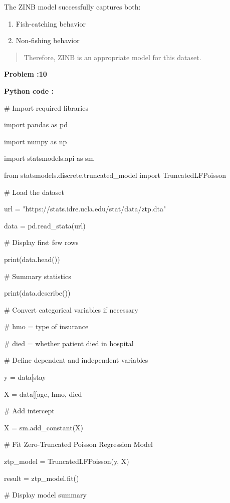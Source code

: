\documentclass[
]{article}
\begin{document}
The ZINB model successfully captures both:

\begin{enumerate}
\def\labelenumi{\arabic{enumi}.}
\item
  Fish-catching behavior
\item
  Non-fishing behavior
\end{enumerate}

\begin{quote}
Therefore, ZINB is an appropriate model for this dataset.
\end{quote}

\textbf{Problem :10}

\textbf{Python code :}

\# Import required libraries

import pandas as pd

import numpy as np

import statsmodels.api as sm

from statsmodels.discrete.truncated\_model import TruncatedLFPoisson

\# Load the dataset

url = "https://stats.idre.ucla.edu/stat/data/ztp.dta"

data = pd.read\_stata(url)

\# Display first few rows

print(data.head())

\# Summary statistics

print(data.describe())

\# Convert categorical variables if necessary

\# hmo = type of insurance

\# died = whether patient died in hospital

\# Define dependent and independent variables

y = data{[}\textquotesingle stay\textquotesingle{]}

X = data{[}{[}\textquotesingle age\textquotesingle,
\textquotesingle hmo\textquotesingle,
\textquotesingle died\textquotesingle{]}{]}

\# Add intercept

X = sm.add\_constant(X)

\# Fit Zero-Truncated Poisson Regression Model

ztp\_model = TruncatedLFPoisson(y, X)

result = ztp\_model.fit()

\# Display model summary
\end{document}
